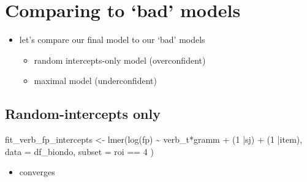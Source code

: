 \documentclass[
  letterpaper,
  DIV=11,
  numbers=noendperiod]{scrartcl}
\newenvironment{Shaded}{\begin{snugshade}}{\end{snugshade}}
\newcommand{\AttributeTok}[1]{\textcolor[rgb]{0.40,0.45,0.13}{#1}}
\newcommand{\DecValTok}[1]{\textcolor[rgb]{0.68,0.00,0.00}{#1}}
\newcommand{\FunctionTok}[1]{\textcolor[rgb]{0.28,0.35,0.67}{#1}}
\newcommand{\NormalTok}[1]{\textcolor[rgb]{0.00,0.23,0.31}{#1}}
\newcommand{\OtherTok}[1]{\textcolor[rgb]{0.00,0.23,0.31}{#1}}
\newcommand{\SpecialCharTok}[1]{\textcolor[rgb]{0.37,0.37,0.37}{#1}}
\providecommand{\tightlist}{%
  \setlength{\itemsep}{0pt}\setlength{\parskip}{0pt}}\usepackage{longtable,booktabs,array}
\begin{document}
\hypertarget{comparing-to-bad-models}{%
\section{Comparing to `bad' models}\label{comparing-to-bad-models}}

\begin{itemize}
\tightlist
\item
  let's compare our final model to our `bad' models

  \begin{itemize}
  \tightlist
  \item
    random intercepts-only model (overconfident)
  \item
    maximal model (underconfident)
  \end{itemize}
\end{itemize}

\hypertarget{random-intercepts-only}{%
\subsection{Random-intercepts only}\label{random-intercepts-only}}

\begin{Shaded}
\begin{Highlighting}[]
\NormalTok{fit\_verb\_fp\_intercepts }\OtherTok{\textless{}{-}} \FunctionTok{lmer}\NormalTok{(}\FunctionTok{log}\NormalTok{(fp) }\SpecialCharTok{\textasciitilde{}}\NormalTok{ verb\_t}\SpecialCharTok{*}\NormalTok{gramm }\SpecialCharTok{+} 
\NormalTok{                      (}\DecValTok{1} \SpecialCharTok{|}\NormalTok{sj) }\SpecialCharTok{+}
\NormalTok{                      (}\DecValTok{1} \SpecialCharTok{|}\NormalTok{item),}
                    \AttributeTok{data =}\NormalTok{ df\_biondo,}
                    \AttributeTok{subset =}\NormalTok{ roi }\SpecialCharTok{==} \DecValTok{4}
\NormalTok{)}
\end{Highlighting}
\end{Shaded}

\begin{itemize}
\tightlist
\item
  converges
\end{itemize}
\end{document}

